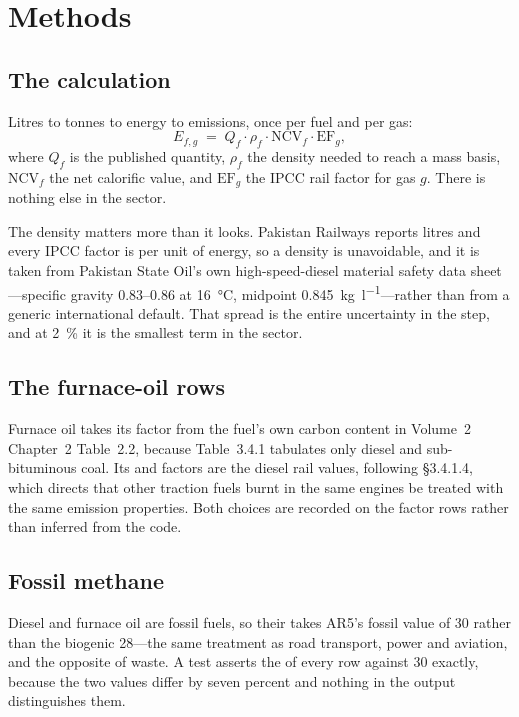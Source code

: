 \section{Methods}
\label{sec:methods}

\subsection{The calculation}

Litres to tonnes to energy to emissions, once per fuel and per gas:
\begin{equation}
E_{f,g} \;=\; Q_f \cdot \rho_f \cdot \mathrm{NCV}_f \cdot \mathrm{EF}_{g},
\label{eq:main}
\end{equation}
where $Q_f$ is the published quantity, $\rho_f$ the density needed to reach a mass basis,
$\mathrm{NCV}_f$ the net calorific value, and $\mathrm{EF}_{g}$ the IPCC rail factor for gas
$g$. There is nothing else in the sector.

The density matters more than it looks. Pakistan Railways reports litres and every IPCC factor
is per unit of energy, so a density is unavoidable, and it is taken from Pakistan State Oil's
own high-speed-diesel material safety data sheet---specific gravity \numrange{0.83}{0.86} at
\SI{16}{\celsius}, midpoint \SI{0.845}{\kilo\gram\per\litre}---rather than from a generic
international default. That spread is the entire uncertainty in the step, and at
\SI{2}{\percent} it is the smallest term in the sector.

\subsection{The furnace-oil rows}

Furnace oil takes its \COtwo{} factor from the fuel's own carbon content in Volume~2 Chapter~2
Table~2.2, because Table~3.4.1 tabulates only diesel and sub-bituminous coal. Its \CHfour{} and
\NtwoO{} factors are the diesel rail values, following §3.4.1.4, which directs that other
traction fuels burnt in the same engines be treated with the same emission properties. Both
choices are recorded on the factor rows rather than inferred from the code.

\subsection{Fossil methane}

Diesel and furnace oil are fossil fuels, so their \CHfour{} takes AR5's fossil value of
\num{30} rather than the biogenic \num{28}---the same treatment as road transport, power and
aviation, and the opposite of waste. A test asserts the \COe{} of every \CHfour{} row against
\num{30} exactly, because the two values differ by seven percent and nothing in the output
distinguishes them.


